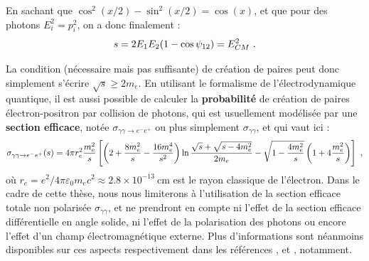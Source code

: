 \begin{refsection}
En sachant que $\cos^2(x/2)-\sin^2(x/2)=\cos(x)$, et que pour des photons $E_i^2=p_i^2$, on a donc finalement :
\begin{equation}
    s=2 E_1 E_2 (1-\cos{\psi_{12}})=E_{CM}^2 ~ \rm .
\end{equation}

La condition (nécessaire mais pas suffisante) de création de paires peut donc simplement s'écrire $\sqrt{s} \ge 2 m_e$. En utilisant le formalisme de l'électrodynamique quantique, il est aussi possible de calculer la \textbf{probabilité} de création de paires électron-positron par collision de photons, qui est usuellement modélisée par une \textbf{section efficace}, notée $\sigma_{\gamma\gamma\to e^-e^+}$ ou plus simplement $\sigma_{\gamma\gamma}$, et qui vaut ici \parencite{greiner_2009} : 
\begin{equation}
    \sigma_{\gamma\gamma\to e^-e^+} (s) =4 \pi r_e^2 \frac{m_e^2}{s} \left[ \left(2 + \frac{8 m_e^2}{s} - \frac{16 m_e^4}{s^2}\right) \ln \frac{\sqrt{s} + \sqrt{s - 4 m_e^2}}{2 m_e} - \sqrt{1 - \frac{4 m_e^2}{s}}\left(1 + 4 \frac{m_e^2}{s}\right)\right] ~ \rm ,
    \label{eq:1-sigma_BWL}
\end{equation}
où $r_e = e^2/4 \pi \varepsilon_0  m_e c^2 \approx 2.8 \times 10^{-13} ~ \si{\cm}$ est le rayon classique de l'électron. Dans le cadre de cette thèse, nous nous limiterons à l'utilisation de la section efficace totale non polarisée $\sigma_{\gamma\gamma}$, et ne prendront en compte ni l'effet de la section efficace différentielle en angle solide, ni l'effet de la polarisation des photons ou encore l'effet d'un champ électromagnétique externe. Plus d'informations sont néanmoins disponibles sur ces aspects respectivement dans les références \parencite{ribeyre_2018}, \parencite{yasui_1993} et \parencite{hartin_2007, satunin_2018}, notamment.


\end{refsection}

